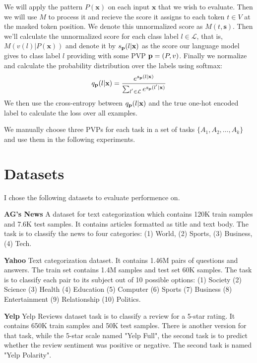 \documentclass[11pt,a4paper]{article}
\begin{document}
We will apply the pattern $P(\textbf{x})$ on each input $\textbf{x}$ that we wish to evaluate.
Then we will use $M$ to process it and recieve the score it assigns to each token $t\in{}V$ at the masked token position.
We denote this unnormalized score as $M(t, \textbf{s})$.
Then we'll calculate the unnormalized score for each class label $l\in{}\mathcal{L}$, that is, $M(v(l) | P(\textbf{x}))$ and denote it by $s_{\text{\textbf{p}}}(l|\textbf{x})$ as the score our language model gives to class label $l$ providing with some PVP $\text{\textbf{p}}=(P, v)$.
Finally we normalize and calculate the probability distribution over the labels using softmax:
\[
	q_\text{\textbf{p}}(l|\textbf{x}) = \frac{e^{s_{\text{\textbf{p}}}(l|\textbf{x})}}{\sum_{l^{'}\in{}\mathcal{L}}e^{s_{\text{\textbf{p}}}(l^{'}|\textbf{x})}}
\]
We then use the cross-entropy between $q_\text{\textbf{p}}(l|\textbf{x})$ and the true one-hot encoded label to calculate the loss over all examples. 

We manually choose three PVPs for each task in a set of tasks $\{A_1, A_2, \dots, A_k\}$ and use them in the following experiments.



\section{Datasets}

I chose the following datasets to evaluate performence on.

\vspace{8pt}
\noindent \textbf{AG's News} \quad
A dataset for text categorization which contains 120K train samples and 7.6K test samples.
It contains articles formatted as title and text body.
The task is to classify the news to four categories: (1) World, (2) Sports, (3) Business, (4) Tech.

\vspace{8pt}
\noindent \textbf{Yahoo} \quad
Text categorization dataset. It contains 1.46M pairs of questions and answers.
The train set contains 1.4M samples and test set 60K samples.
The task is to classify each pair to its subject out of 10 possible options: (1) Society (2) Science (3) Health (4) Education (5) Computer (6) Sports (7) Business (8) Entertainment (9) Relationship (10) Politics.

\vspace{8pt}
\noindent \textbf{Yelp} \quad
Yelp Reviews dataset task is to classify a review for a 5-star rating.
It contains 650K train samples and 50K test samples.
There is another version for that task, while the 5-star scale named "Yelp Full", the second task is to predict whether the review sentiment was positive or negative.
The second task is named "Yelp Polarity".
\end{document}
